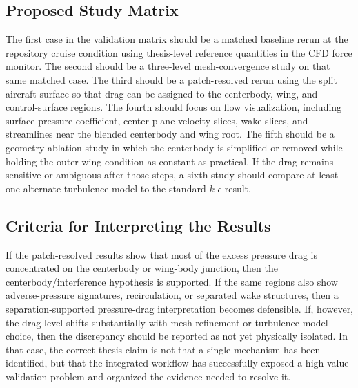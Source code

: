 \subsection{Proposed Study Matrix}
The first case in the validation matrix should be a matched baseline rerun at the repository cruise condition using thesis-level reference quantities in the CFD force monitor. The second should be a three-level mesh-convergence study on that same matched case. The third should be a patch-resolved rerun using the split aircraft surface so that drag can be assigned to the centerbody, wing, and control-surface regions. The fourth should focus on flow visualization, including surface pressure coefficient, center-plane velocity slices, wake slices, and streamlines near the blended centerbody and wing root. The fifth should be a geometry-ablation study in which the centerbody is simplified or removed while holding the outer-wing condition as constant as practical. If the drag remains sensitive or ambiguous after those steps, a sixth study should compare at least one alternate turbulence model to the standard \(k\)-\(\epsilon\) result.

\subsection{Criteria for Interpreting the Results}
If the patch-resolved results show that most of the excess pressure drag is concentrated on the centerbody or wing-body junction, then the centerbody/interference hypothesis is supported. If the same regions also show adverse-pressure signatures, recirculation, or separated wake structures, then a separation-supported pressure-drag interpretation becomes defensible. If, however, the drag level shifts substantially with mesh refinement or turbulence-model choice, then the discrepancy should be reported as not yet physically isolated. In that case, the correct thesis claim is not that a single mechanism has been identified, but that the integrated workflow has successfully exposed a high-value validation problem and organized the evidence needed to resolve it.
